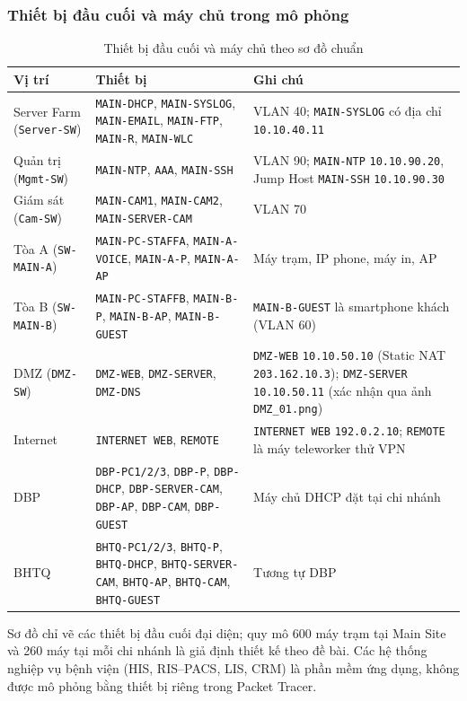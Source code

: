 \subsubsection{Thiết bị đầu cuối và máy chủ trong mô phỏng}
\begin{small}
\setlength{\tabcolsep}{4pt}
\begin{longtable}{|p{3.6cm}|p{4.0cm}|p{6.2cm}|}
\caption{Thiết bị đầu cuối và máy chủ theo sơ đồ chuẩn} \label{tab:endpoints} \\
\hline
\textbf{Vị trí} & \textbf{Thiết bị} & \textbf{Ghi chú} \\ \hline
\endhead
Server Farm (\texttt{Server-SW}) & \texttt{MAIN-DHCP}, \texttt{MAIN-SYSLOG}, \texttt{MAIN-EMAIL}, \texttt{MAIN-FTP}, \texttt{MAIN-R}, \texttt{MAIN-WLC} & VLAN 40; \texttt{MAIN-SYSLOG} có địa chỉ \texttt{10.10.40.11} \\ \hline
Quản trị (\texttt{Mgmt-SW}) & \texttt{MAIN-NTP}, \texttt{AAA}, \texttt{MAIN-SSH} & VLAN 90; \texttt{MAIN-NTP} \texttt{10.10.90.20}, Jump Host \texttt{MAIN-SSH} \texttt{10.10.90.30} \\ \hline
Giám sát (\texttt{Cam-SW}) & \texttt{MAIN-CAM1}, \texttt{MAIN-CAM2}, \texttt{MAIN-SERVER-CAM} & VLAN 70 \\ \hline
Tòa A (\texttt{SW-MAIN-A}) & \texttt{MAIN-PC-STAFFA}, \texttt{MAIN-A-VOICE}, \texttt{MAIN-A-P}, \texttt{MAIN-A-AP} & Máy trạm, IP phone, máy in, AP \\ \hline
Tòa B (\texttt{SW-MAIN-B}) & \texttt{MAIN-PC-STAFFB}, \texttt{MAIN-B-P}, \texttt{MAIN-B-AP}, \texttt{MAIN-B-GUEST} & \texttt{MAIN-B-GUEST} là smartphone khách (VLAN 60) \\ \hline
DMZ (\texttt{DMZ-SW}) & \texttt{DMZ-WEB}, \texttt{DMZ-SERVER}, \texttt{DMZ-DNS} & \texttt{DMZ-WEB} \texttt{10.10.50.10} (Static NAT \texttt{203.162.10.3}); \texttt{DMZ-SERVER} \texttt{10.10.50.11} (xác nhận qua ảnh \texttt{DMZ\_01.png}) \\ \hline
Internet & \texttt{INTERNET WEB}, \texttt{REMOTE} & \texttt{INTERNET WEB} \texttt{192.0.2.10}; \texttt{REMOTE} là máy teleworker thử VPN \\ \hline
DBP & \texttt{DBP-PC1/2/3}, \texttt{DBP-P}, \texttt{DBP-DHCP}, \texttt{DBP-SERVER-CAM}, \texttt{DBP-AP}, \texttt{DBP-CAM}, \texttt{DBP-GUEST} & Máy chủ DHCP đặt tại chi nhánh \\ \hline
BHTQ & \texttt{BHTQ-PC1/2/3}, \texttt{BHTQ-P}, \texttt{BHTQ-DHCP}, \texttt{BHTQ-SERVER-CAM}, \texttt{BHTQ-AP}, \texttt{BHTQ-CAM}, \texttt{BHTQ-GUEST} & Tương tự DBP \\ \hline
\end{longtable}
\end{small}
\noindent Sơ đồ chỉ vẽ các thiết bị đầu cuối đại diện; quy mô 600 máy trạm tại Main Site và 260 máy tại mỗi chi nhánh là giả định thiết kế theo đề bài. Các hệ thống nghiệp vụ bệnh viện (HIS, RIS--PACS, LIS, CRM) là phần mềm ứng dụng, không được mô phỏng bằng thiết bị riêng trong Packet Tracer.

